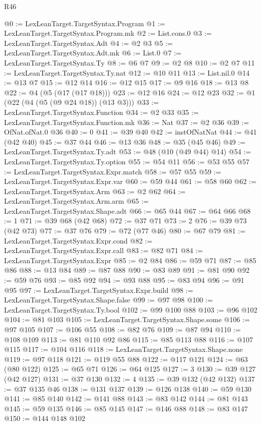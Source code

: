 \begin{lexlean}{R46}
\begin{coremodule}
@0 := LexLeanTarget.TargetSyntax.Program
@1 := LexLeanTarget.TargetSyntax.Program.mk
@2 := List.cons.{0}
@3 := LexLeanTarget.TargetSyntax.Adt
@4 := @2 @3
@5 := LexLeanTarget.TargetSyntax.Adt.mk
@6 := List.{0}
@7 := LexLeanTarget.TargetSyntax.Ty
@8 := @6 @7
@9 := @2 @8
@10 := @2 @7
@11 := LexLeanTarget.TargetSyntax.Ty.nat
@12 := @10 @11
@13 := List.nil.{0}
@14 := @13 @7
@15 := @12 @14
@16 := @12 @15
@17 := @9 @16
@18 := @13 @8
@22 := @4 (@5 (@17 (@17 @18)))
@23 := @12 @16
@24 := @12 @23
@32 := @1 (@22 (@4 (@5 (@9 @24 @18)) (@13 @3)))
@33 := LexLeanTarget.TargetSyntax.Function
@34 := @2 @33
@35 := LexLeanTarget.TargetSyntax.Function.mk
@36 := Nat
@37 := @2 @36
@39 := OfNat.ofNat.{0} @36
@40 := 0
@41 := @39 @40
@42 := instOfNatNat
@44 := @41 (@42 @40)
@45 := @37 @44
@46 := @13 @36
@48 := @35 (@45 @46)
@49 := LexLeanTarget.TargetSyntax.Ty.adt
@53 := @48 (@10 (@49 @44) @14)
@54 := LexLeanTarget.TargetSyntax.Ty.option
@55 := @54 @11
@56 := @53 @55
@57 := LexLeanTarget.TargetSyntax.Expr.match
@58 := @57 @55
@59 := LexLeanTarget.TargetSyntax.Expr.var
@60 := @59 @44
@61 := @58 @60
@62 := LexLeanTarget.TargetSyntax.Arm
@63 := @2 @62
@64 := LexLeanTarget.TargetSyntax.Arm.arm
@65 := LexLeanTarget.TargetSyntax.Shape.adt
@66 := @65 @44
@67 := @64 @66
@68 := 1
@71 := @39 @68 (@42 @68)
@72 := @37 @71
@73 := 2
@76 := @39 @73 (@42 @73)
@77 := @37 @76
@79 := @72 (@77 @46)
@80 := @67 @79
@81 := LexLeanTarget.TargetSyntax.Expr.cond
@82 := LexLeanTarget.TargetSyntax.Expr.call
@83 := @82 @71
@84 := LexLeanTarget.TargetSyntax.Expr
@85 := @2 @84
@86 := @59 @71
@87 := @85 @86
@88 := @13 @84
@89 := @87 @88
@90 := @83 @89
@91 := @81 @90
@92 := @59 @76
@93 := @85 @92
@94 := @93 @88
@95 := @83 @94
@96 := @91 @95
@97 := LexLeanTarget.TargetSyntax.Expr.build
@98 := LexLeanTarget.TargetSyntax.Shape.false
@99 := @97 @98
@100 := LexLeanTarget.TargetSyntax.Ty.bool
@102 := @99 @100 @88
@103 := @96 @102
@104 := @81 @103
@105 := LexLeanTarget.TargetSyntax.Shape.some
@106 := @97 @105
@107 := @106 @55
@108 := @82 @76
@109 := @87 @94
@110 := @108 @109
@113 := @81 @110 @92 @86
@115 := @85 @113 @88
@116 := @107 @115
@117 := @104 @116
@118 := LexLeanTarget.TargetSyntax.Shape.none
@119 := @97 @118
@121 := @119 @55 @88
@122 := @117 @121
@124 := @63 (@80 @122)
@125 := @65 @71
@126 := @64 @125
@127 := 3
@130 := @39 @127 (@42 @127)
@131 := @37 @130
@132 := 4
@135 := @39 @132 (@42 @132)
@137 := @37 @135 @46
@138 := @131 @137
@139 := @126 @138
@140 := @59 @130
@141 := @85 @140
@142 := @141 @88
@143 := @83 @142
@144 := @81 @143
@145 := @59 @135
@146 := @85 @145
@147 := @146 @88
@148 := @83 @147
@150 := @144 @148 @102

\end{coremodule}
\end{lexlean}
